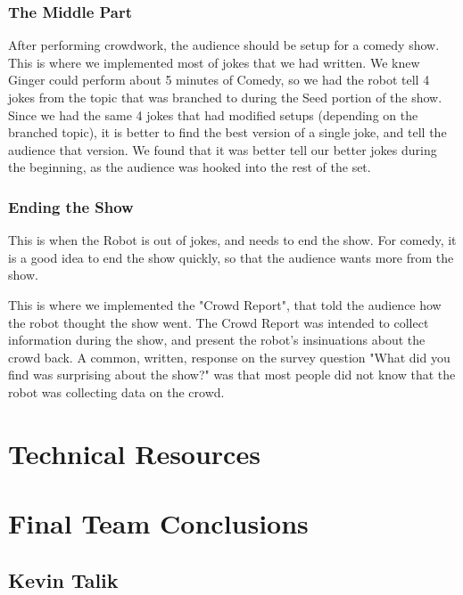 \documentclass[onecolumn, draftclsnofoot,10pt, compsoc]{IEEEtran}
\begin{document}
    \subsubsection{The Middle Part}

    After performing crowdwork, the audience should be setup for a comedy show. This is where we implemented most of jokes that we had written.
    We knew Ginger could perform about 5 minutes of Comedy, so we had the robot tell 4 jokes from the topic that was branched to during the Seed portion of the show.
    Since we had the same 4 jokes that had modified setups (depending on the branched topic), it is better to find the best version of a single joke, and tell the audience that version. We found that it was better tell our better jokes during the beginning, as the audience was hooked into the rest of the set.

    \subsubsection{Ending the Show}
    
    This is when the Robot is out of jokes, and needs to end the show. 
    For comedy, it is a good idea to end the show quickly, so that the audience wants more from the show.

    This is where we implemented the "Crowd Report", that told the audience how the robot thought the show went.
    The Crowd Report was intended to collect information during the show, and present the robot's insinuations about the crowd back.
    A common, written, response on the survey question "What did you find was surprising about the show?" was that most people did not know that the robot was collecting data on the crowd.


\section{Technical Resources}

\pagebreak
\section{Final Team Conclusions}
\subsection{Kevin Talik}
\end{document}
